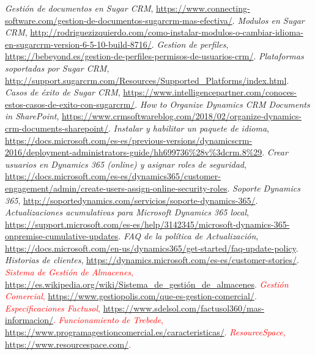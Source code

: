 \documentclass{article}
\begin{document}
\begin{thebibliography}{9}
 \textit{Gestión de documentos en Sugar CRM}, \url{https://www.connecting-software.com/gestion-de-documentos-sugarcrm-mas-efectiva/}.
 \textit{Modulos en Sugar CRM}, \url{http://rodriguezizquierdo.com/como-instalar-modulos-o-cambiar-idioma-en-sugarcrm-version-6-5-10-build-8716/}.
 \textit{Gestion de perfiles}, \url{https://bebeyond.es/gestion-de-perfiles-permisos-de-usuarios-crm/}.
 \textit{Plataformas soportadas por Sugar CRM}, \url{http://support.sugarcrm.com/Resources/Supported_Platforms/index.html}.
 \textit{Casos de éxito de Sugar CRM}, \url{https://www.intelligencepartner.com/conoces-estos-casos-de-exito-con-sugarcrm/}.
 \textit{How to Organize Dynamics CRM Documents in SharePoint}, \url{https://www.crmsoftwareblog.com/2018/02/organize-dynamics-crm-documents-sharepoint/}.
 \textit{Instalar y habilitar un paquete de idioma}, \url{https://docs.microsoft.com/es-es/previous-versions/dynamicscrm-2016/deployment-administrators-guide/hh699736\%28v\%3dcrm.8\%29}.
 \textit{Crear usuarios en Dynamics 365 (online) y asignar roles de seguridad}, \url{https://docs.microsoft.com/es-es/dynamics365/customer-engagement/admin/create-users-assign-online-security-roles}.
 \textit{Soporte Dynamics 365}, \url{http://soportedynamics.com/servicios/soporte-dynamics-365/}.
 \textit{Actualizaciones acumulativas para Microsoft Dynamics 365 local}, \url{https://support.microsoft.com/es-es/help/3142345/microsoft-dynamics-365-onpremise-cumulative-updates}.
 \textit{FAQ de la política de Actualización}, \url{https://docs.microsoft.com/en-us/dynamics365/get-started/faq-update-policy}.
 \textit{Historias de clientes}, \url{https://dynamics.microsoft.com/es-es/customer-stories/}.
\textcolor{Red}{ \textit{Sistema de Gestión de Almacenes}, \url{https://es.wikipedia.org/wiki/Sistema_de_gestión_de_almacenes}.}
\textcolor{Red}{ \textit{Gestión Comercial}, \url{https://www.gestiopolis.com/que-es-gestion-comercial/}.}
\textcolor{Red}{ \textit{Especificaciones Factusol}, \url{https://www.sdelsol.com/factusol360/mas-informacion/}.}
\textcolor{Red}{ \textit{Funcionamiento de Trebede}, \url{https://www.programagestioncomercial.es/caracteristicas/}.}
\textcolor{Red}{ \textit{ResourceSpace}, \url{https://www.resourcespace.com/}.}
\end{thebibliography}
\end{document}
